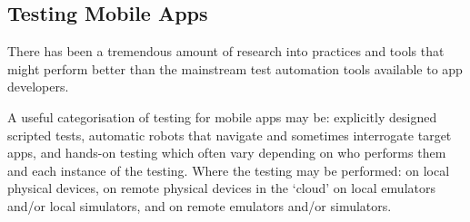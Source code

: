 \hypertarget{mobile.testing}{}
\subsection{Testing Mobile Apps}

There has been a tremendous amount of research into practices and tools that might perform better than the mainstream test automation tools available to app developers.

A useful categorisation of testing for mobile apps may be: 
explicitly designed scripted tests, 
automatic robots that navigate and sometimes interrogate target apps, and 
hands-on testing which often vary depending on who performs them and each instance of the testing. 
Where the testing may be performed:
on local physical devices,
on remote physical devices in the `cloud'
on local emulators and/or local simulators, and
on remote emulators and/or simulators.



